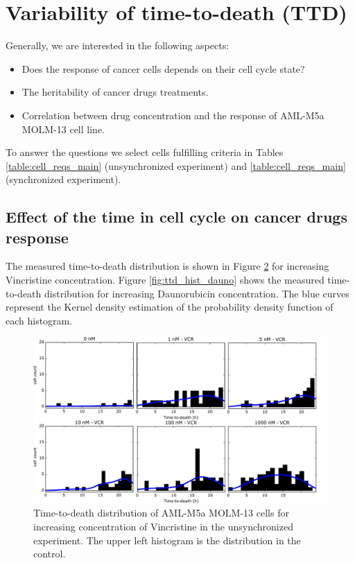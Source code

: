 \documentclass[pdftex,12pt,a4paper]{report}
\begin{document}
\begin{figure}[H]
\label{fig:ccd_diff_all}
\end{figure}

\section{Variability of time-to-death (TTD)}
\label{section:ttd_tic_sisters}

Generally, we are interested in the following aspects:

\begin{itemize}
\item Does the response of cancer cells depends on their cell cycle state?

\item The heritability of cancer drugs treatments.

\item Correlation between drug concentration and the response of AML-M5a MOLM-13 cell line.
\end{itemize}

To answer the questions we select cells fulfilling criteria in Tables \ref{table:cell_reqs_main} (unsynchronized experiment) and \ref{table:cell_reqs_main} (synchronized experiment).

\subsection{Effect of the time in cell cycle on cancer drugs response}

The measured time-to-death distribution is shown in Figure \ref{fig:ttd_hist_vcr} for increasing Vincristine concentration. Figure \ref{fig:ttd_hist_dauno} shows the measured time-to-death distribution for increasing Daunorubicin concentration. The blue curves represent the Kernel density estimation of the probability density function of each histogram.

\begin{figure}[H]
\centering
\includegraphics[width=\textwidth]{images/ttd/unsyn/vcr_all.pdf}
\caption[Distribution of TTD for every Vincristine concentration in the unsynchronized experiment]{Time-to-death distribution of AML-M5a MOLM-13 cells for increasing concentration of Vincristine in the unsynchronized experiment. The upper left histogram is the distribution in the control.}
\label{fig:ttd_hist_vcr}
\end{figure}
\end{document}
